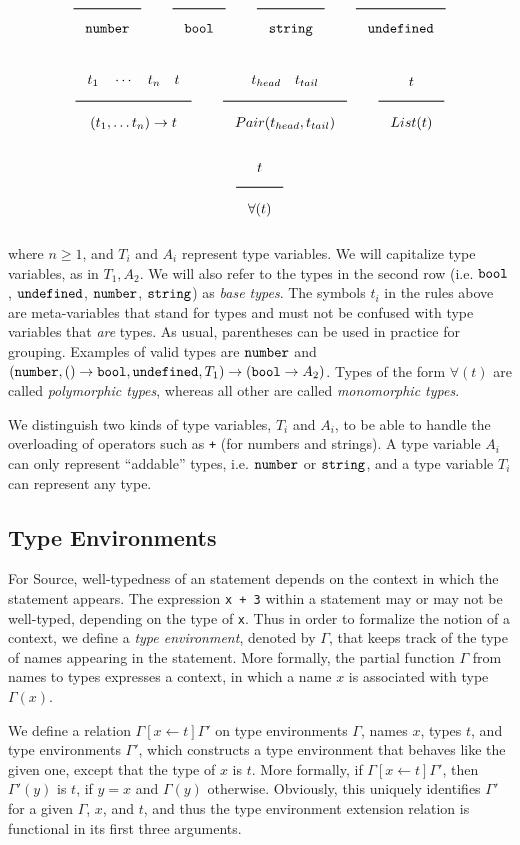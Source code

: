 \[
\Rule{}{\Number}
\qquad
\Rule{}{\Bool}
\qquad
\Rule{}{\String}
\qquad
\Rule{}{\Undefined}
\]

\[ \Rule{t_1 \quad \cdots\quad t_n\quad t}{(t_1, \ldots t_n) \rightarrow t}
\qquad
\Rule{t_{head} \quad t_{tail}}{Pair(t_{head},t_{tail})}
\qquad
\Rule{t}{List(t)}
\]
\[
\Rule{t}{\forall ( t )} \]

\noindent
where $n \geq 1$, and $T_i$ and $A_i$ represent type variables. We will capitalize 
type variables, as in $T_1, A_2$. We will also refer to the types in the second row (i.e. $\texttt{bool}$,
$\texttt{undefined}$, $\texttt{number}$, $\texttt{string}$) as \emph{base types}. The symbols $t_i$ in the rules above
are meta-variables that stand for types and must not be confused with type variables
that \emph{are} types.
As usual, parentheses can be used in practice for grouping.
Examples of valid types are $\texttt{number}$ and
$(\texttt{number}, () \rightarrow \texttt{bool}, \texttt{undefined}, T_1) \rightarrow (\texttt{bool} \rightarrow A_2)$.
Types of the form $\forall ( t )$ are called \emph{polymorphic types}, whereas
all other are called \emph{monomorphic types}.

We distinguish two kinds of type variables, $T_i$ and $A_i$, to be able to handle
the overloading of operators such as \texttt{+} (for numbers and strings).
A type variable $A_i$ can only
represent ``addable'' types, i.e. 
$\texttt{number}$ or $\texttt{string}$, and
a type variable $T_i$ can represent any type.

\subsection{Type Environments}

For Source, well-typedness of an statement depends on the context in which the
statement appears. The expression \verb#x + 3# within a statement may or may 
not be well-typed, depending on the type of \verb#x#. Thus in order 
to formalize the notion of a context, we define a 
\emph{type environment}, denoted by $\Gamma$, that keeps track
of the type of names appearing in the statement. More
formally,
the partial function $\Gamma$ from names to types expresses a 
context, in which a name $x$ is associated with type $\Gamma(x)$. 

We define a relation $\Gamma[x \leftarrow t]\Gamma'$ on type environments 
$\Gamma$, names $x$, types $t$, and type environments $\Gamma'$,
which constructs a type environment that behaves like the 
given one, except that the type of $x$ is $t$. More formally, 
if $\Gamma[x \leftarrow t]\Gamma'$, then $\Gamma'(y)$ is $t$, 
if $y=x$ and $\Gamma(y)$ 
otherwise. Obviously, this uniquely identifies $\Gamma'$ for
a given $\Gamma$, $x$, and $t$, and thus the type environment extension
relation is functional in its first three arguments.

